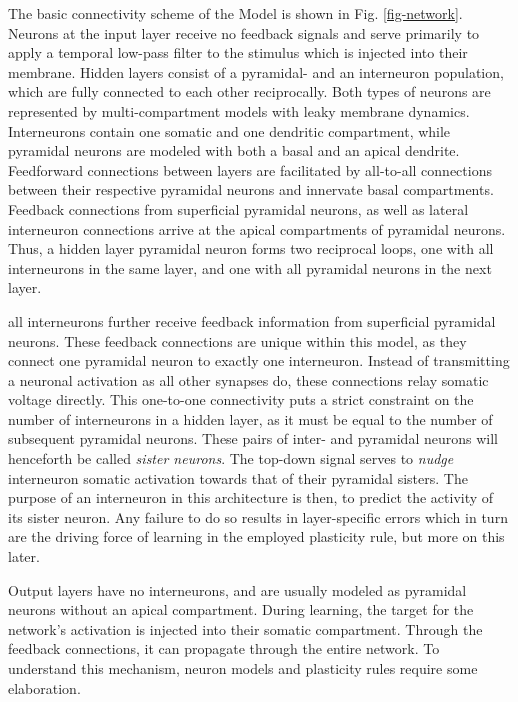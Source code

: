 
The basic connectivity scheme of the Model is shown in Fig. \ref{fig-network}. Neurons at the input layer receive no
feedback signals and serve primarily to apply a temporal low-pass filter to the stimulus which is injected into their
membrane.  Hidden layers consist of a pyramidal- and an interneuron population, which are fully connected to each other
reciprocally. Both types of neurons are represented by multi-compartment models with leaky membrane dynamics.
Interneurons contain one somatic and one dendritic compartment, while pyramidal neurons are modeled with both a basal
and an apical dendrite.  Feedforward connections between layers are facilitated by all-to-all connections between their
respective pyramidal neurons and innervate basal compartments. Feedback connections from superficial pyramidal neurons,
as well as lateral interneuron connections arrive at the apical compartments of pyramidal neurons. Thus, a hidden layer
pyramidal neuron forms two reciprocal loops, one with all interneurons in the same layer, and one with all pyramidal
neurons in the next layer.

all interneurons further receive feedback information from superficial pyramidal neurons. These feedback connections are
unique within this model, as they connect one pyramidal neuron to exactly one interneuron. Instead of transmitting a
neuronal activation as all other synapses do, these connections relay somatic voltage directly. This one-to-one
connectivity puts a strict constraint on the number of interneurons in a hidden layer, as it must be equal to the number
of subsequent pyramidal neurons. These pairs of inter- and pyramidal neurons will henceforth be called \textit{sister
neurons}. The top-down signal serves to \textit{nudge} interneuron somatic activation towards that of their pyramidal
sisters. The purpose of an interneuron in this architecture is then, to predict the activity of its sister neuron. Any
failure to do so results in layer-specific errors which in turn are the driving force of learning in the employed
plasticity rule, but more on this later.

Output layers have no interneurons, and are usually modeled as pyramidal neurons without an apical compartment. During
learning, the target for the network's activation is injected into their somatic compartment. Through the feedback
connections, it can propagate through the entire network. To understand this mechanism, neuron models and plasticity
rules require some elaboration.


